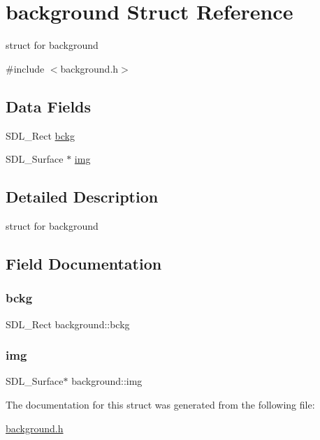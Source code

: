 \hypertarget{structbackground}{}\section{background Struct Reference}
\label{structbackground}


struct for background  




{\ttfamily \#include $<$background.\+h$>$}

\subsection*{Data Fields}
\begin{DoxyCompactItemize}
\item 
S\+D\+L\+\_\+\+Rect \hyperlink{structbackground_a6cd0518c8d8a98207f008f55de18de1d}{bckg}
\item 
S\+D\+L\+\_\+\+Surface $\ast$ \hyperlink{structbackground_a1c5c3a3ebb56924b9f829602f9641006}{img}
\end{DoxyCompactItemize}


\subsection{Detailed Description}
struct for background 

\subsection{Field Documentation}
\mbox{\label{structbackground_a6cd0518c8d8a98207f008f55de18de1d}} 
\subsubsection{\texorpdfstring{bckg}{bckg}}
{\footnotesize\ttfamily S\+D\+L\+\_\+\+Rect background\+::bckg}

\mbox{\label{structbackground_a1c5c3a3ebb56924b9f829602f9641006}} 
\subsubsection{\texorpdfstring{img}{img}}
{\footnotesize\ttfamily S\+D\+L\+\_\+\+Surface$\ast$ background\+::img}



The documentation for this struct was generated from the following file\+:\begin{DoxyCompactItemize}
\item 
\hyperlink{background_8h}{background.\+h}\end{DoxyCompactItemize}
